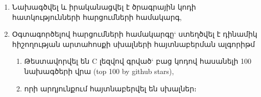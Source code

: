 {
	\begin{enumerate}[itemsep=1mm]
		\item
		Նախագծվել և իրականացվել է ծրագրային կոդի հատկությունների հարցումների համակարգ,

		\item
		Օգտագործելով հարցումների համակարգը` ստեղծվել է դինամիկ հիշողության արտահոսքի սխալների հայտնաբերման ալգորիթմ

        {
			\begin{enumerate}[itemsep=1mm]
				\item
				Թեստավորվել են C լեզվով գրված` բաց կոդով հասանելի 100 նախագծերի վրա (top 100 by github stars),
				\item որի արդյունքում հայտնաբերվել են սխալներ։
			\end{enumerate}
		}

	\end{enumerate}
}
